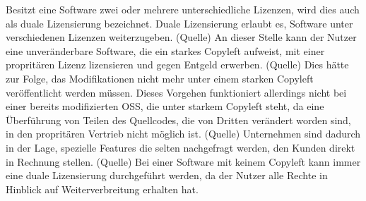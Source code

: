 Besitzt eine Software zwei oder mehrere unterschiedliche Lizenzen, wird dies auch als duale Lizensierung bezeichnet. Duale Lizensierung erlaubt es, Software unter verschiedenen Lizenzen weiterzugeben. (Quelle) An dieser Stelle kann der Nutzer eine unveränderbare Software, die ein starkes Copyleft aufweist, mit einer propritären Lizenz lizensieren und gegen Entgeld erwerben. (Quelle) Dies hätte zur Folge, das Modifikationen nicht mehr unter einem starken Copyleft veröffentlicht werden müssen. Dieses Vorgehen funktioniert allerdings nicht bei einer bereits modifizierten OSS, die unter starkem Copyleft steht, da eine Überführung von Teilen des Quellcodes, die von Dritten verändert worden sind, in den propritären Vertrieb nicht möglich ist. (Quelle) Unternehmen sind dadurch in der Lage, spezielle Features die selten nachgefragt werden, den Kunden direkt in Rechnung stellen. (Quelle) Bei einer Software mit keinem Copyleft kann immer eine duale Lizensierung durchgeführt werden, da der Nutzer alle Rechte in Hinblick auf Weiterverbreitung erhalten hat. 






